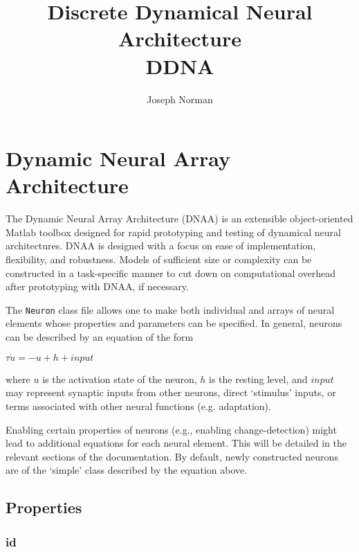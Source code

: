 \documentclass[phd, 12pt, doublespace, online]{fauthesis}
\title{Discrete Dynamical Neural Architecture \\DDNA}
\author{Joseph Norman}
\begin{document}
\frontmatter

\maketitle
\makecopyright
\makesignature



\tableofcontents
\nolistoftables					%
\listoffigures					%

\mainmatter


\chapter{Dynamic Neural Array Architecture}

The Dynamic Neural Array Architecture (DNAA) is an extensible object-oriented Matlab toolbox designed for rapid prototyping and testing of dynamical neural architectures. DNAA is designed with a focus on ease of implementation, flexibility, and robustness. Models of sufficient size or complexity can be constructed in a task-specific manner to cut down on computational overhead after prototyping with DNAA, if necessary. 


The {\tt Neuron} class file allows one to make both individual and arrays of neural elements whose properties and parameters can be specified. In general, neurons can be described by an equation of the form

\bigskip
\noindent $ \tau \dot{u} = -u + h + input $

\bigskip
\noindent where $u$ is the activation state of the neuron, $h$ is the resting level, and $input$ may represent synaptic inputs from other neurons, direct `stimulus' inputs, or terms associated with other neural functions (e.g. adaptation). 

Enabling certain properties of neurons (e.g., enabling change-detection) might lead to additional equations for each neural element. This will be detailed in the relevant sections of the documentation. By default, newly constructed neurons are of the `simple' class described by the equation above. 

\section{Properties}

\subsection{id}
\end{document}
